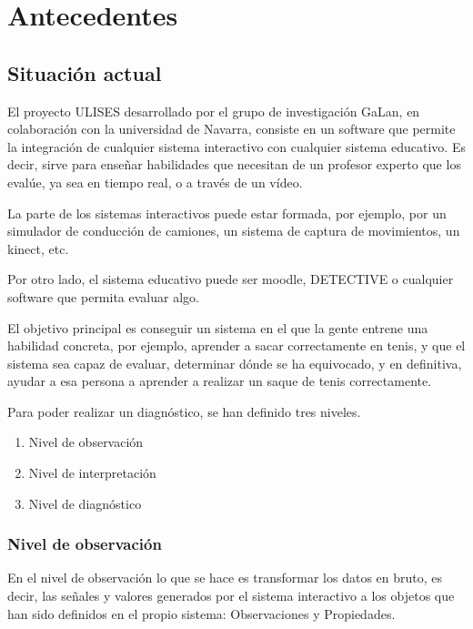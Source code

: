 \chapter{Antecedentes}

\section{Situaci\'on actual}
El proyecto ULISES desarrollado por el grupo de investigaci\'on GaLan, en colaboraci\'on con la universidad de Navarra, 
consiste en un software que permite la integraci\'on de cualquier sistema interactivo con cualquier
sistema educativo. Es decir, sirve para ense\~nar habilidades que necesitan de un profesor experto que los eval\'ue,
ya sea en tiempo real, o a trav\'es de un v\'ideo.


La parte de los sistemas interactivos puede estar formada, por ejemplo, por un simulador de conducci\'on de camiones,
un sistema de captura de movimientos, un kinect, etc.

Por otro lado, el sistema educativo puede ser moodle, DETECTIVE o cualquier software que permita evaluar algo.

El objetivo principal es conseguir un sistema en el que la gente entrene una habilidad concreta, por ejemplo, aprender
a sacar correctamente en tenis, y que el sistema sea capaz de evaluar, determinar d\'onde se ha equivocado, y en definitiva,
ayudar a esa persona a aprender a realizar un saque de tenis correctamente.

Para poder realizar un diagn\'ostico, se han definido tres niveles.

\begin{enumerate}
	\item Nivel de observaci\'on
	\item Nivel de interpretaci\'on
	\item Nivel de diagn\'ostico
\end{enumerate}

\subsection{Nivel de observaci\'on}
En el nivel de observaci\'on lo que se hace es transformar los datos en bruto, 
es decir, las se\~nales y valores generados por el sistema interactivo
a los objetos que han sido definidos en el propio sistema: Observaciones y Propiedades.

